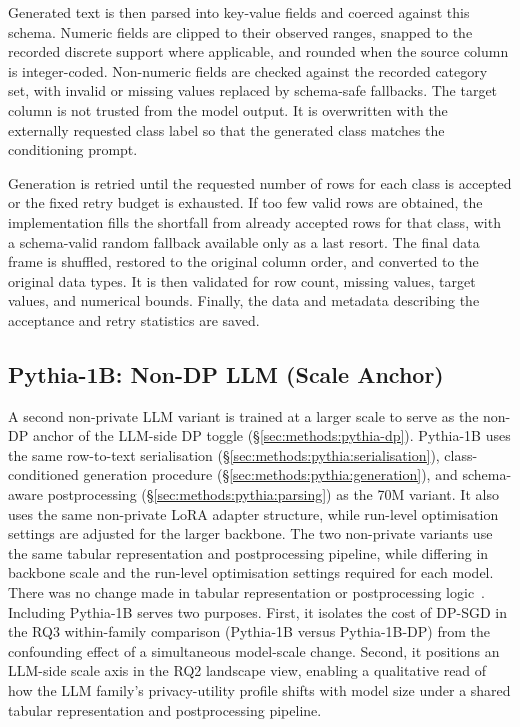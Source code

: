 Generated text is then parsed into key-value fields and coerced
against this schema. Numeric fields
are clipped to their observed ranges, snapped to the recorded discrete
support where applicable, and rounded when the source column is
integer-coded. Non-numeric fields are checked against the recorded
category set, with invalid or missing values replaced by schema-safe
fallbacks. The target column is not trusted from the model output. It
is overwritten with the externally requested class label so that the
generated class matches the conditioning prompt.

Generation is retried until the requested number of rows for each
class is accepted or the fixed retry budget is exhausted. If too few
valid rows are obtained, the implementation fills the shortfall from
already accepted rows for that class, with a schema-valid random
fallback available only as a last resort. The final data frame is 
shuffled, restored to the original column order,
and converted to the original data types. It is then validated for row
count, missing values, target values, and numerical bounds. Finally, the
data and metadata describing the acceptance and retry statistics are
saved.

\subsection{Pythia-1B: Non-DP LLM (Scale Anchor)}
\label{sec:methods:pythia-1b}


A second non-private LLM variant is trained at a larger scale to serve as
the non-DP anchor of the LLM-side DP toggle
(\S\ref{sec:methods:pythia-dp}). Pythia-1B uses the same row-to-text
serialisation (\S\ref{sec:methods:pythia:serialisation}), class-conditioned
generation procedure (\S\ref{sec:methods:pythia:generation}), and
schema-aware postprocessing (\S\ref{sec:methods:pythia:parsing}) as the 70M
variant. It also uses
the same non-private LoRA adapter structure, while run-level optimisation
settings are adjusted for the larger backbone. The two non-private variants 
use the same tabular representation and
postprocessing pipeline, while differing in backbone scale and the
run-level optimisation settings required for each model. There was no change made
in tabular representation or postprocessing logic~\cite{Biderman2023Pythia}.
Including Pythia-1B serves two purposes.
First, it isolates the cost of DP-SGD in the RQ3 within-family comparison
(Pythia-1B versus Pythia-1B-DP) from the confounding effect of a simultaneous
model-scale change. Second, it positions an LLM-side scale axis in the RQ2
landscape view, enabling a qualitative read of how the LLM family's
privacy-utility profile shifts with model size under a shared tabular
representation and postprocessing pipeline.

